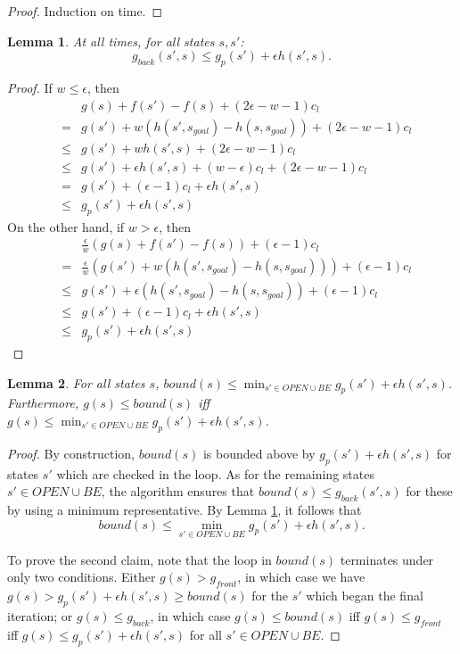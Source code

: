 \documentclass[letterpaper]{article}
\newtheorem{lemma}{Lemma}
\begin{document}
\begin{proof}
Induction on time.
\end{proof}

\begin{lemma}
\label{lem:indep}
At all times, for all states $s,s'$:
\[g_{back}(s',s) \le g_p(s') + \epsilon h(s',s).\]
\end{lemma}

\begin{proof}
If $w \le \epsilon$, then
\begin{eqnarray*}
&&g(s) + f(s') - f(s) + (2\epsilon-w-1)c_l
\\&=& g(s') + w(h(s',s_{goal}) - h(s,s_{goal})) + (2\epsilon-w-1)c_l
\\&\le& g(s') + wh(s',s) + (2\epsilon-w-1)c_l
\\&\le& g(s') + \epsilon h(s',s) + (w-\epsilon)c_l + (2\epsilon-w-1)c_l
\\&=& g(s') + (\epsilon-1)c_l + \epsilon h(s',s)
\\&\le& g_p(s') + \epsilon h(s',s)
\end{eqnarray*}
On the other hand, if $w > \epsilon$, then
\begin{eqnarray*}
&&\frac\epsilon w\left(g(s) + f(s') - f(s)\right) + (\epsilon-1)c_l
\\&=& \frac\epsilon w\left(g(s') + w(h(s',s_{goal}) - h(s,s_{goal})) \right) + (\epsilon-1)c_l
\\&\le& g(s') + \epsilon(h(s',s_{goal}) - h(s,s_{goal})) + (\epsilon-1)c_l
\\&\le& g(s') + (\epsilon-1)c_l + \epsilon h(s',s)
\\&\le& g_p(s') + \epsilon h(s',s)
\end{eqnarray*}
\end{proof}

\begin{lemma}
\label{lem:bound}
For all states $s$, $bound(s) \le \min_{s'\in OPEN \cup BE} g_p(s') + \epsilon h(s',s)$. Furthermore, $g(s) \le bound(s)$ iff $g(s) \le \min_{s'\in OPEN \cup BE} g_p(s') + \epsilon h(s',s)$.
\end{lemma}

\begin{proof}
By construction, $bound(s)$ is bounded above by $g_p(s') + \epsilon h(s',s)$ for states $s'$ which are checked in the loop. As for the remaining states $s' \in OPEN \cup BE$, the algorithm ensures that $bound(s) \le g_{back}(s',s)$ for these by using a minimum representative. By Lemma \ref{lem:indep}, it follows that
\[bound(s) \le \min_{s' \in OPEN \cup BE} g_p(s') + \epsilon h(s',s).\]

To prove the second claim, note that the loop in $bound(s)$ terminates under only two conditions. Either $g(s) > g_{front}$, in which case we have $g(s) > g_p(s') + \epsilon h(s',s) \ge bound(s)$ for the $s'$ which began the final iteration; or $g(s) \le g_{back}$, in which case $g(s) \le bound(s)$ iff $g(s) \le g_{front}$ iff $g(s) \le g_p(s') + \epsilon h(s',s)$ for all $s' \in OPEN \cup BE$.
\end{proof}
\end{document}
